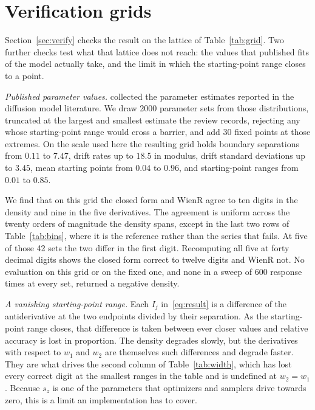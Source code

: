 \documentclass[final,5p,times,twocolumn,authoryear]{elsarticle}
\begin{document}
\section{Verification grids}
\label{app:grids}

Section~\ref{sec:verify} checks the result on the lattice of Table~\ref{tab:grid}. Two further checks test what that lattice does not reach: the values that published fits of the model actually take, and the limit in which the starting-point range closes to a point.

\emph{Published parameter values.} \citet{tran2021systematic} collected the parameter estimates reported in the diffusion model literature. We draw 2000 parameter sets from those distributions, truncated at the largest and smallest estimate the review records, rejecting any whose starting-point range would cross a barrier, and add 30 fixed points at those extremes. On the scale used here the resulting grid holds boundary separations from $0.11$ to $7.47$, drift rates up to $18.5$ in modulus, drift standard deviations up to $3.45$, mean starting points from $0.04$ to $0.96$, and starting-point ranges from $0.01$ to $0.85$.

We find that on this grid the closed form and WienR agree to ten digits in the density and nine in the five derivatives. The agreement is uniform across the twenty orders of magnitude the density spans, except in the last two rows of Table~\ref{tab:bins}, where it is the reference rather than the series that fails. At five of those 42 sets the two differ in the first digit. Recomputing all five at forty decimal digits shows the closed form correct to twelve digits and WienR not. No evaluation on this grid or on the fixed one, and none in a sweep of 600 response times at every set, returned a negative density.

\emph{A vanishing starting-point range.} Each $I_j$ in~\eqref{eq:result} is a difference of the antiderivative at the two endpoints divided by their separation. As the starting-point range closes, that difference is taken between ever closer values and relative accuracy is lost in proportion. The density degrades slowly, but the derivatives with respect to $w_1$ and $w_2$ are themselves such differences and degrade faster. They are what drives the second column of Table~\ref{tab:width}, which has lost every correct digit at the smallest ranges in the table and is undefined at $w_2 = w_1$. Because $s_z$ is one of the parameters that optimizers and samplers drive towards zero, this is a limit an implementation has to cover.
\end{document}
